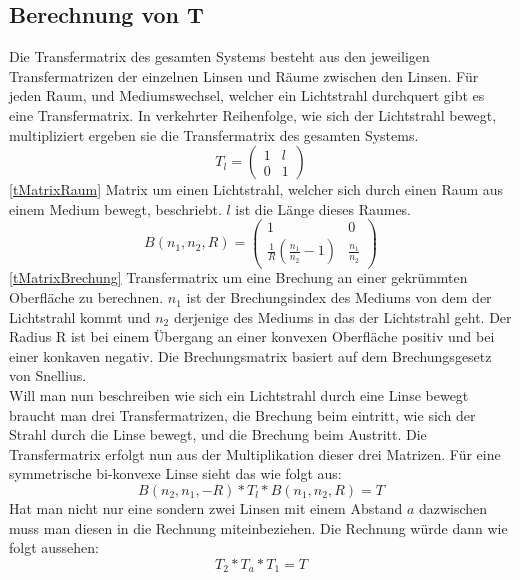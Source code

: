 \documentclass[11pt,twoside,a4paper]{article}
\begin{document}
	\subsection{Berechnung von T}
	Die Transfermatrix des gesamten Systems besteht aus den jeweiligen Transfermatrizen der einzelnen Linsen und Räume zwischen den Linsen. Für jeden Raum, und Mediumswechsel, welcher ein Lichtstrahl durchquert gibt es eine Transfermatrix. In verkehrter Reihenfolge, wie sich der Lichtstrahl bewegt, multipliziert ergeben sie die Transfermatrix des gesamten Systems.
	\begin{equation} \label{tMatrixRaum}
	T_{l} = 
	\begin{pmatrix}
	1 & l \\
	0 & 1
	\end{pmatrix}
	\end{equation}
	\ref{tMatrixRaum} Matrix um einen Lichtstrahl, welcher sich durch einen Raum aus einem Medium bewegt, beschriebt. \(l\) ist die Länge dieses Raumes.
	\begin{equation} \label{tMatrixBrechung}
		B(n_{1},n_{2},R) = 
		\begin{pmatrix}
		1 & 0 \\
		\frac{1}{R}(\frac{n_{1}}{n_{2}}-1) & \frac{n_{1}}{n_{2}}
		\end{pmatrix}
	\end{equation}
	\ref{tMatrixBrechung} Transfermatrix um eine Brechung an einer gekrümmten Oberfläche zu berechnen. \(n_{1}\) ist der Brechungsindex des Mediums von dem der Lichtstrahl kommt und \(n_{2}\) derjenige des Mediums in das der Lichtstrahl geht. Der Radius R ist bei einem Übergang an einer konvexen Oberfläche positiv und bei einer konkaven negativ. Die Brechungsmatrix basiert auf dem Brechungsgesetz von Snellius.  \\
	Will man nun beschreiben wie sich ein Lichtstrahl durch eine Linse bewegt braucht man drei Transfermatrizen, die Brechung beim eintritt, wie sich der Strahl durch die Linse bewegt, und die Brechung beim Austritt. Die Transfermatrix erfolgt nun aus der Multiplikation dieser drei Matrizen. Für eine symmetrische bi-konvexe Linse sieht das wie folgt aus: 
	\begin{equation} \label{SymmLinse}
	B(n_{2},n_{1},-R)*T_{l}*B(n_{1},n_{2},R) = T
	\end{equation}
	Hat man nicht nur eine sondern zwei Linsen mit einem Abstand \(a\) dazwischen muss man diesen in die Rechnung miteinbeziehen. Die Rechnung würde dann wie folgt aussehen: 
	\begin{equation} \label{SymmLinse}
	T_{2}*T_{a}*T_{1} = T
	\end{equation}
\end{document}
